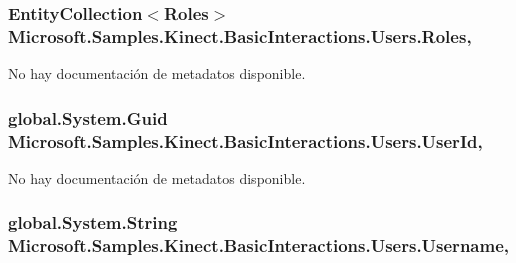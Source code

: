 \hypertarget{class_microsoft_1_1_samples_1_1_kinect_1_1_basic_interactions_1_1_users_acfe6810d292d87a17243c703e892edd8}{
\subsubsection[{Roles}]{\setlength{\rightskip}{0pt plus 5cm}Entity\-Collection$<${\bf Roles}$>$ Microsoft.\-Samples.\-Kinect.\-Basic\-Interactions.\-Users.\-Roles\hspace{0.3cm}{\ttfamily [get]}, {\ttfamily [set]}}}\label{class_microsoft_1_1_samples_1_1_kinect_1_1_basic_interactions_1_1_users_acfe6810d292d87a17243c703e892edd8}


No hay documentación de metadatos disponible. 

\hypertarget{class_microsoft_1_1_samples_1_1_kinect_1_1_basic_interactions_1_1_users_a99471154b57f706a5484f4f20a504acc}{
\subsubsection[{User\-Id}]{\setlength{\rightskip}{0pt plus 5cm}global.\-System.\-Guid Microsoft.\-Samples.\-Kinect.\-Basic\-Interactions.\-Users.\-User\-Id\hspace{0.3cm}{\ttfamily [get]}, {\ttfamily [set]}}}\label{class_microsoft_1_1_samples_1_1_kinect_1_1_basic_interactions_1_1_users_a99471154b57f706a5484f4f20a504acc}


No hay documentación de metadatos disponible. 

\hypertarget{class_microsoft_1_1_samples_1_1_kinect_1_1_basic_interactions_1_1_users_aa69014a550876a3c85fb3d81ac7ae968}{
\subsubsection[{Username}]{\setlength{\rightskip}{0pt plus 5cm}global.\-System.\-String Microsoft.\-Samples.\-Kinect.\-Basic\-Interactions.\-Users.\-Username\hspace{0.3cm}{\ttfamily [get]}, {\ttfamily [set]}}}\label{class_microsoft_1_1_samples_1_1_kinect_1_1_basic_interactions_1_1_users_aa69014a550876a3c85fb3d81ac7ae968}


